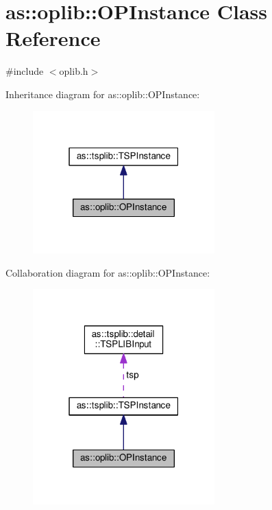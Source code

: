 \hypertarget{classas_1_1oplib_1_1OPInstance}{}\section{as\+:\+:oplib\+:\+:O\+P\+Instance Class Reference}
\label{classas_1_1oplib_1_1OPInstance}


{\ttfamily \#include $<$oplib.\+h$>$}



Inheritance diagram for as\+:\+:oplib\+:\+:O\+P\+Instance\+:\nopagebreak
\begin{figure}[H]
\begin{center}
\leavevmode
\includegraphics[width=199pt]{classas_1_1oplib_1_1OPInstance__inherit__graph}
\end{center}
\end{figure}


Collaboration diagram for as\+:\+:oplib\+:\+:O\+P\+Instance\+:\nopagebreak
\begin{figure}[H]
\begin{center}
\leavevmode
\includegraphics[width=199pt]{classas_1_1oplib_1_1OPInstance__coll__graph}
\end{center}
\end{figure}
